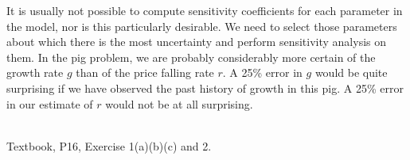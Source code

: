 It is usually not possible to compute sensitivity coefficients for each parameter in the model, nor is this particularly desirable. We need to select those parameters about which there is the most uncertainty and perform sensitivity analysis on them. In the pig problem, we are probably considerably more certain of the growth rate $g$ than of the price falling rate $r$. A 25\% error in $g$ would be quite surprising if we have observed the past history of growth in this pig. A 25\% error in our estimate of $r$ would not be at all surprising.

\vspace{2em}
\\
Textbook, P16, Exercise 1(a)(b)(c) and 2.
